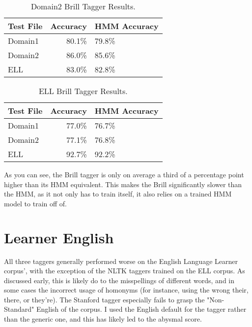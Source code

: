 \documentclass[11pt,a4paper]{article}
\begin{document}
\begin{table}[h]
  \begin{center}
  \begin{tabular}{|l|rl|}
  \hline \bf Test File & \bf Accuracy & \bf HMM Accuracy \\ \hline
  Domain1 & 80.1\% & 79.8\% \\
  Domain2 & 86.0\% & 85.6\%  \\
  ELL  & 83.0\% & 82.8\%  \\
  \hline
  \end{tabular}
  \end{center}
  \caption{\label{d2Br-table} Domain2 Brill Tagger Results. }
\end{table}

\begin{table}[h]
  \begin{center}
  \begin{tabular}{|l|rl|}
  \hline \bf Test File & \bf Accuracy & \bf HMM Accuracy \\ \hline
  Domain1 & 77.0\% & 76.7\% \\
  Domain2 & 77.1\% & 76.8\%  \\
  ELL  & 92.7\% & 92.2\% \\
  \hline
  \end{tabular}
  \end{center}
  \caption{\label{ellBr-table} ELL Brill Tagger Results. }
\end{table}

As you can see, the Brill tagger is only on average a third of a
percentage point higher than its HMM equivalent. This makes the Brill
significantly slower than the HMM, as it not only has to train itself,
it also relies on a trained HMM model to train off of.

\section{Learner English}
All three taggers generally performed worse on the English Language Learner
corpus', with the exception of the NLTK taggers trained on the
ELL corpus. As discussed early, this is likely do to the misspellings
of different words, and in some cases the incorrect usage of homonyms
(for instance, using the wrong their, there, or they're). The Stanford
tagger especially fails to grasp the "Non-Standard" English of the corpus.
I used the English default for the tagger rather than the generic one,
and this has likely led to the abysmal score.
\end{document}
